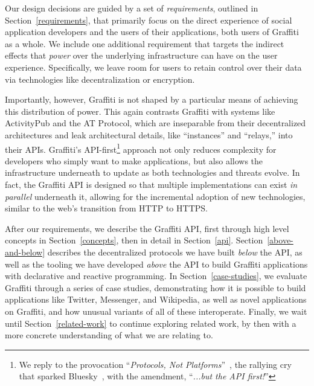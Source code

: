 Our design decisions are guided by a set of \emph{requirements}, outlined
in Section~\ref{requirements}, that primarily focus on the direct experience
of social application developers and the users of their applications,
both users of Graffiti as a whole.
We include one additional requirement that targets the indirect
effects that \emph{power} over the underlying infrastructure
can have on the user experience.
Specifically, we leave room for users to retain control over their data
via technologies like decentralization or encryption.

Importantly, however, Graffiti is not shaped by a particular
means of achieving this distribution of power. This again contrasts Graffiti
with systems like ActivityPub and the AT Protocol,
which are inseparable from their decentralized architectures
and leak architectural details, like ``instances'' and ``relays,''
into their APIs.
Graffiti's API-first\footnote{
We reply to the provocation ``\emph{Protocols, Not Platforms}''~{\cite{protocolsnotplatforms}},
the rallying cry that sparked Bluesky~{\cite{bluesky_from_protocols}},
with the amendment, ``\emph{...but the API first!}''
} approach not only reduces complexity for
developers who simply want to make applications,
but also allows the infrastructure underneath
to update as both technologies and threats evolve.
In fact, the Graffiti API is designed so that multiple implementations can exist
\emph{in parallel} underneath it,
allowing for the incremental adoption of new technologies,
similar to the web's transition from HTTP to HTTPS.

After our requirements, we describe the Graffiti API,
first through high level concepts in Section~\ref{concepts},
then in detail in Section~\ref{api}.
Section~\ref{above-and-below} describes
the decentralized protocols we have built \emph{below} the API,
as well as the tooling we have developed \emph{above} the API
to build Graffiti applications with declarative and reactive programming.
In Section~\ref{case-studies},
we evaluate Graffiti through a series of case studies, demonstrating
how it is possible to build applications like Twitter, Messenger, and
Wikipedia, as well as novel applications on Graffiti, and how unusual
variants of all of these interoperate.
Finally, we wait until Section~\ref{related-work}
to continue exploring related work, by then with a more concrete
understanding of what we are relating to.
